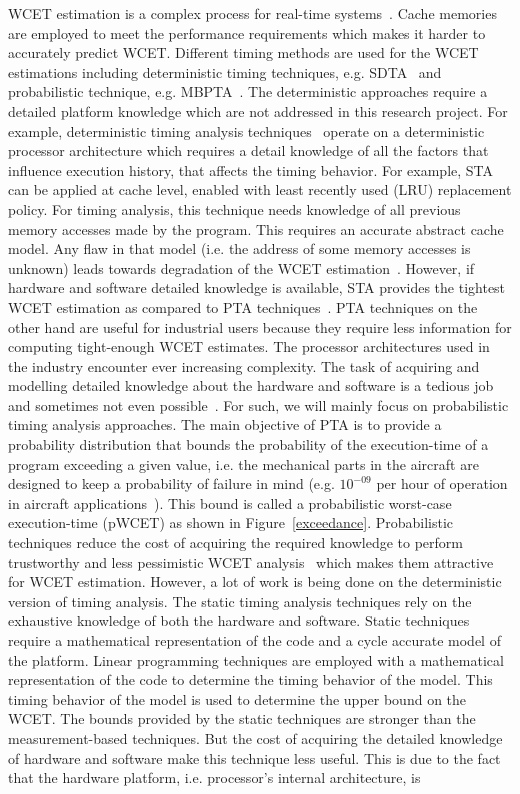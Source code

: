 WCET estimation is a complex process for real-time systems~\cite{bernat2002wcet}. Cache memories are employed to meet the performance requirements which makes it harder to  accurately predict WCET. Different timing methods are used for the WCET estimations including deterministic timing techniques, e.g. SDTA~\cite{wolf2002timing} and probabilistic technique, e.g. MBPTA~\cite{kosmidis2014measurement}. The deterministic approaches require a detailed platform knowledge which are not addressed in this research project. For example, deterministic timing analysis techniques~\cite{Wilhelm:2008:WEP:1347375.1347389} operate on a deterministic processor architecture which requires a detail knowledge of all the factors that influence execution history, that affects the timing behavior. For example, STA can be applied at cache level, enabled with least recently used (LRU) replacement policy. For timing analysis, this technique needs knowledge of all previous memory accesses made by the program. This requires an accurate abstract cache model. Any flaw in that model (i.e. the address of some memory accesses is unknown) leads towards degradation of the WCET estimation~\cite{abella2014comparison}. However, if hardware and software detailed knowledge is available, STA provides the tightest WCET estimation as compared to PTA techniques~\cite{kosmidis2014measurement}. PTA techniques on the other hand are useful for industrial users because they require less information for computing tight-enough WCET estimates. The processor architectures used in the industry encounter ever increasing complexity. The task of acquiring and modelling detailed knowledge about the hardware and software is a tedious job and sometimes not even possible~\cite{mezzetti2015randomized}. For such, we will mainly focus on probabilistic timing analysis approaches. The main objective of PTA is to provide a probability distribution that bounds the probability  of the execution-time of a program exceeding a given value, i.e. the mechanical parts in the aircraft are designed to keep a probability of failure in mind (e.g. $10^{-09}$ per hour of operation in aircraft applications~\cite{heimdahl2007safety}). This bound is called a probabilistic worst-case execution-time (pWCET) as shown in Figure~\ref{exceedance}. Probabilistic techniques reduce the cost of acquiring the required knowledge to perform trustworthy and less pessimistic WCET analysis~\cite{cucu2012measurement} which makes them attractive for WCET estimation. However, a lot of work is being done on the deterministic version of timing analysis. The static timing analysis techniques rely on the exhaustive knowledge of both the hardware and software. Static techniques require a mathematical representation of the code and a cycle accurate model of the platform. Linear programming techniques are employed with a mathematical representation of the code to determine the timing behavior of the model. This timing behavior of the model is used to determine the upper bound on the WCET. The bounds provided by the static techniques are stronger than the measurement-based techniques. But the cost of acquiring the detailed knowledge of hardware and software make this technique less useful. This is due to the fact that the hardware platform, i.e. processor's internal architecture, is 
